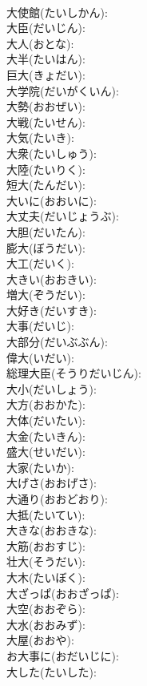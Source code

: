 \documentclass[8pt]{extreport}
\begin{document}
\begin{CJK}{UTF8}{min}
\\	大使館(たいしかん): 
\\	大臣(だいじん): 
\\	大人(おとな): 
\\	大半(たいはん): 
\\	巨大(きょだい): 
\\	大学院(だいがくいん): 
\\	大勢(おおぜい): 
\\	大戦(たいせん): 
\\	大気(たいき): 
\\	大衆(たいしゅう): 
\\	大陸(たいりく): 
\\	短大(たんだい): 
\\	大いに(おおいに): 
\\	大丈夫(だいじょうぶ): 
\\	大胆(だいたん): 
\\	膨大(ぼうだい): 
\\	大工(だいく): 
\\	大きい(おおきい): 
\\	増大(ぞうだい): 
\\	大好き(だいすき): 
\\	大事(だいじ): 
\\	大部分(だいぶぶん): 
\\	偉大(いだい): 
\\	総理大臣(そうりだいじん): 
\\	大小(だいしょう): 
\\	大方(おおかた): 
\\	大体(だいたい): 
\\	大金(たいきん): 
\\	盛大(せいだい): 
\\	大家(たいか): 
\\	大げさ(おおげさ): 
\\	大通り(おおどおり): 
\\	大抵(たいてい): 
\\	大きな(おおきな): 
\\	大筋(おおすじ): 
\\	壮大(そうだい): 
\\	大木(たいぼく): 
\\	大ざっぱ(おおざっぱ): 
\\	大空(おおぞら): 
\\	大水(おおみず): 
\\	大屋(おおや): 
\\	お大事に(おだいじに): 
\\	大した(たいした): 

\end{CJK}
\end{document}
